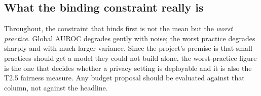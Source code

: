 \subsection{What the binding constraint really is}

Throughout, the constraint that binds first is not the mean but the \emph{worst practice}. Global
AUROC degrades gently with noise; the worst practice degrades sharply and with much larger variance.
Since the project's premise is that small practices should get a model they could not build alone,
the worst-practice figure is the one that decides whether a privacy setting is deployable and it
is also the T2.5 fairness measure. Any budget proposal should be evaluated against that column, not
against the headline.
